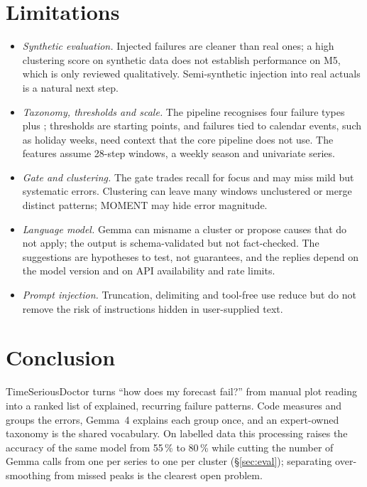 \documentclass[10pt,twocolumn,a4paper]{article}
\newcommand{\code}[1]{\texttt{\detokenize{#1}}}
\begin{document}
\section{Limitations}
\label{sec:limits}

\begin{itemize}
  \item \emph{Synthetic evaluation.} Injected failures are cleaner than real ones; a high clustering score on synthetic data does not establish performance on M5, which is only reviewed qualitatively. Semi-synthetic injection into real actuals is a natural next step.
  \item \emph{Taxonomy, thresholds and scale.} The pipeline recognises four failure types plus \code{other}; thresholds are starting points, and failures tied to calendar events, such as holiday weeks, need context that the core pipeline does not use. The features assume 28-step windows, a weekly season and univariate series.
  \item \emph{Gate and clustering.} The gate trades recall for focus and may miss mild but systematic errors. Clustering can leave many windows unclustered or merge distinct patterns; MOMENT may hide error magnitude.
  \item \emph{Language model.} Gemma can misname a cluster or propose causes that do not apply; the output is schema-validated but not fact-checked. The suggestions are hypotheses to test, not guarantees, and the replies depend on the model version and on API availability and rate limits.
  \item \emph{Prompt injection.} Truncation, delimiting and tool-free use reduce but do not remove the risk of instructions hidden in user-supplied text.
\end{itemize}

\section{Conclusion}
\label{sec:conclusion}

TimeSeriousDoctor turns ``how does my forecast fail?'' from manual plot reading into a ranked list of explained, recurring failure patterns. Code measures and groups the errors, Gemma~4 explains each group once, and an expert-owned taxonomy is the shared vocabulary. On labelled data this processing raises the accuracy of the same model from 55\,\% to 80\,\% while cutting the number of Gemma calls from one per series to one per cluster (\S\ref{sec:eval}); separating over-smoothing from missed peaks is the clearest open problem.
\end{document}
